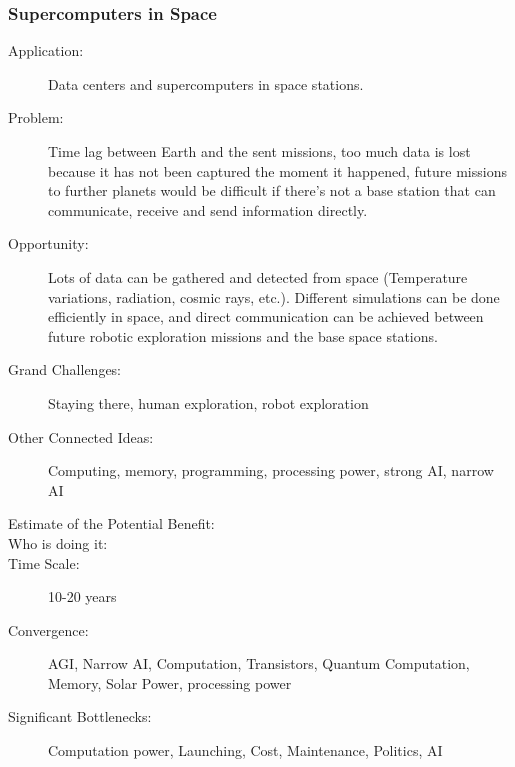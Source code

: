 \subsubsection{Supercomputers in Space }
\begin{description}  \item[Application:] Data centers and supercomputers in space stations.
\item[Problem:] Time lag between  Earth and the sent missions, too much data is lost because it has not  been captured the moment it happened, future missions to further planets  would be difficult if there's not a base station that can communicate,  receive and send information directly.
\item[Opportunity:] 
Lots of data can be gathered and  detected from space (Temperature variations, radiation, cosmic rays,  etc.). Different simulations can be done efficiently in space, and  direct communication can be achieved between future robotic exploration  missions and the base space stations.
\item[Grand  Challenges:] Staying there, human exploration, robot exploration
\item[Other Connected Ideas:] Computing, memory, programming,  processing power, strong AI, narrow AI
\item[Estimate  of the Potential Benefit:] 
\item[Who  is doing it:]
\item[Time Scale:] 10-20 years
\item[Convergence:] \gls{AGI}, Narrow  AI, Computation, Transistors, Quantum Computation, Memory, Solar Power,  processing power
\item[Significant Bottlenecks:]  Computation power, Launching, Cost, Maintenance, Politics, AI
\end{description}
 
